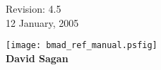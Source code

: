 \thispagestyle{empty}

\begin{flushright}
\large
  Revision: 4.5 \\
  12 January, 2005 \\
\end{flushright}

\vfill

{
\begin{center}
\texttt{[image: bmad\_ref\_manual.psfig]} \\
\vskip 0.3in
\huge\bf David Sagan
\end{center}
}

\vfill
\break